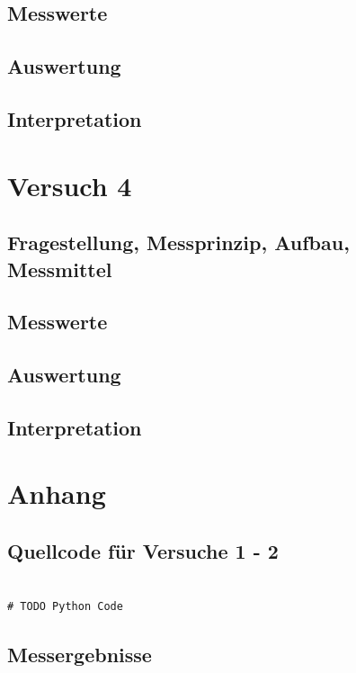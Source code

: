 \documentclass[12pt,oneside,a4paper]{report}
\begin{document}
\section{Messwerte}
\label{chap:VERSUCH_3_MESSWERTE}

\section{Auswertung}
\label{chap:VERSUCH_3_AUSWERTUNG}

\section{Interpretation}
\label{chap:VERSUCH_3_INTERPRETATION}

%
%
\chapter{Versuch 4}
\label{chap:VERSUCH_4}

\section{Fragestellung, Messprinzip, Aufbau, Messmittel}
\label{chap:VERSUCH_4_FRAGESTELLUNG}

\section{Messwerte}
\label{chap:VERSUCH_4_MESSWERTE}

\section{Auswertung}
\label{chap:VERSUCH_4_AUSWERTUNG}

\section{Interpretation}
\label{chap:VERSUCH_4_INTERPRETATION}
%
%
\renewcommand\thesection{A.\arabic{section}}
\renewcommand\thesubsection{\thesection.\arabic{subsection}}

\chapter*{Anhang}
\label{chap:APPENDIX}
\addtocounter{chapter}{1}
\setcounter{section}{0}

\section{Quellcode für Versuche 1 - 2}
\label{chap:APPENDIX_SOURCECODE}
\begin{lstlisting}[style=PYTHON, frame=single, caption=QuellCodeV1 bis V2, captionpos=b, label=lst:Code]

# TODO Python Code

\end{lstlisting}

\section{Messergebnisse}
\label{chap:APPENDIX_MEASUREMENT_SOURCE}

%
%

\end{document}
